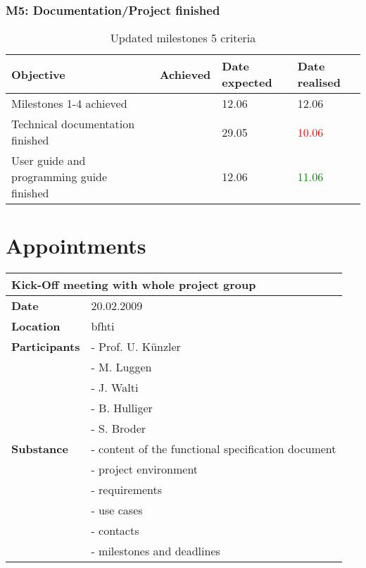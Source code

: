 \subsubsection{M5: Documentation/Project finished}
\label{sec:M5DocumentationProjectFinished}
\begin{table}[H]
	\centering
	\begin{tabular}{|p{}|p{}|p{}|p{}|}
		\hline 
		\bfseries Objective & \bfseries Achieved & \bfseries Date expected  & \bfseries Date realised \\ 
		\hline
		\hline 
		Milestones 1-4 achieved 			& \tick & 12.06 &	12.06 \\
		\hline 
		Technical documentation finished 		& \tick & 29.05 &	\textcolor{red}{10.06} \\
		\hline 
		User guide and programming guide finished  	& \tick & 12.06 &	\textcolor{green}{11.06} \\
		\hline 
	\end{tabular}
	\caption{Updated milestones 5 criteria}
\end{table}

\section{Appointments}
\label{sec:MeetingWithVanDerKleij}


\begin{table}[H]
	\centering
	\begin{tabular}{|b{}|b{}|}
		\hline
 		\multicolumn{2}{|l|}{\bfseries Kick-Off meeting with whole project group} \\
		\hline\hline
		\bfseries Date & 20.02.2009 \\
		\hline
		\bfseries Location & \gls{bfhti} \\
		\hline
		\bfseries Participants & - Prof. U. K\"unzler \\
		&- M. Luggen\\
		&- J. Walti\\
		&- B. Hulliger\\
		&- S. Broder \\
		\hline
		\bfseries Substance & - content of the functional specification document \\
		&- project environment \\
		&- requirements \\
		&- use cases\\
		&- contacts\\
		&- milestones and deadlines \\
		\hline
	\end{tabular}
\end{table}

